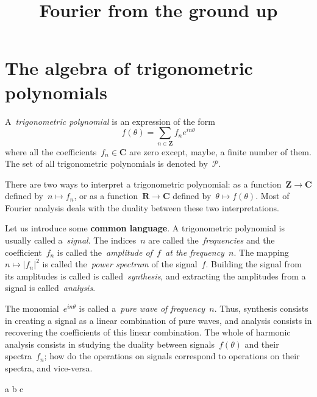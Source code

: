 \title{Fourier from the ground up}


\section{The algebra of trigonometric polynomials}


\newcommand{\Z}{\mathbf{Z}}
\newcommand{\R}{\mathbf{R}}
\newcommand{\C}{\mathbf{C}}
\newcommand{\PP}{\mathcal{P}}

\begin{definition}
A~\emph{trigonometric polynomial} is an expression of the form
$$
	f(\theta)=\sum_{n\in\Z} f_n e^{in\theta}
$$
where all the coefficients~$f_n\in\C$ are zero except, maybe, a finite
number of them.  The set of all trigonometric polynomials is denoted
by~$\PP$.
\end{definition}

There are two ways to interpret a trigonometric polynomial: as a
function~$\Z\to\C$ defined by~$n\mapsto f_n$, or as a function~$\R\to\C$
defined by~$\theta\mapsto f(\theta)$.  Most of Fourier analysis deals with
the duality between these two interpretations.

Let us introduce some {\bf common language}.
A trigonometric polynomial is usually called a~\emph{signal}.  The
indices~$n$ are called the~\emph{frequencies} and the coefficient~$f_n$
is called the~\emph{amplitude of~$f$~at the frequency~$n$}.  The
mapping~$n\mapsto\left|f_n\right|^2$ is called the~\emph{power
spectrum} of the signal~$f$.  Building the signal from its amplitudes
is called is called~\emph{synthesis}, and extracting the amplitudes
from a signal is called~\emph{analysis}.

The monomial~$e^{in\theta}$ is called a~\emph{pure wave of frequency~$n$}.
Thus, synthesis consists in creating a signal as a linear combination of pure
waves, and analysis consists in recovering the coefficients of this linear
combination.  The whole of harmonic analysis consists in studying the duality
between signals~$f(\theta)$ and their spectra~$f_n$; how do the operations on
signals correspond to operations on their spectra, and vice-versa.

\begin{definition}
	a b c
\end{definition}


